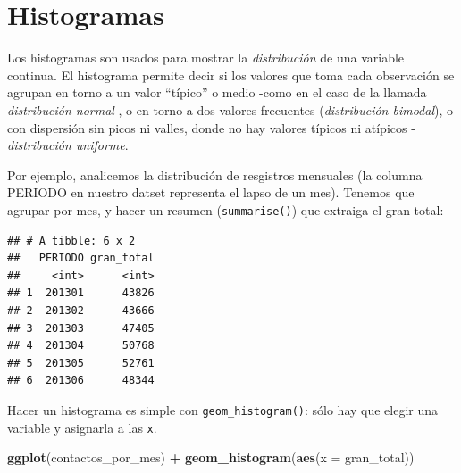 \documentclass[]{book}
\newenvironment{Shaded}{\begin{snugshade}}{\end{snugshade}}
\newcommand{\KeywordTok}[1]{\textcolor[rgb]{0.13,0.29,0.53}{\textbf{#1}}}
\newcommand{\DataTypeTok}[1]{\textcolor[rgb]{0.13,0.29,0.53}{#1}}
\newcommand{\StringTok}[1]{\textcolor[rgb]{0.31,0.60,0.02}{#1}}
\newcommand{\OperatorTok}[1]{\textcolor[rgb]{0.81,0.36,0.00}{\textbf{#1}}}
\newcommand{\NormalTok}[1]{#1}
\begin{document}
\section{Histogramas}\label{histogramas}

Los histogramas son usados para mostrar la \emph{distribución} de una
variable continua. El histograma permite decir si los valores que toma
cada observación se agrupan en torno a un valor ``típico'' o medio -como
en el caso de la llamada \emph{distribución normal}-, o en torno a dos
valores frecuentes (\emph{distribución bimodal}), o con dispersión sin
picos ni valles, donde no hay valores típicos ni atípicos -
\emph{distribución uniforme}.

Por ejemplo, analicemos la distribución de resgistros mensuales (la
columna PERIODO en nuestro datset representa el lapso de un mes).
Tenemos que agrupar por mes, y hacer un resumen (\texttt{summarise()})
que extraiga el gran total:

\begin{Shaded}
\end{Shaded}

\begin{verbatim}
## # A tibble: 6 x 2
##   PERIODO gran_total
##     <int>      <int>
## 1  201301      43826
## 2  201302      43666
## 3  201303      47405
## 4  201304      50768
## 5  201305      52761
## 6  201306      48344
\end{verbatim}

Hacer un histograma es simple con \texttt{geom\_histogram()}: sólo hay
que elegir una variable y asignarla a las \texttt{x}.

\begin{Shaded}
\begin{Highlighting}[]
\KeywordTok{ggplot}\NormalTok{(contactos_por_mes) }\OperatorTok{+}\StringTok{ }
\StringTok{    }\KeywordTok{geom_histogram}\NormalTok{(}\KeywordTok{aes}\NormalTok{(}\DataTypeTok{x =}\NormalTok{ gran_total))}
\end{Highlighting}
\end{Shaded}
\end{document}
